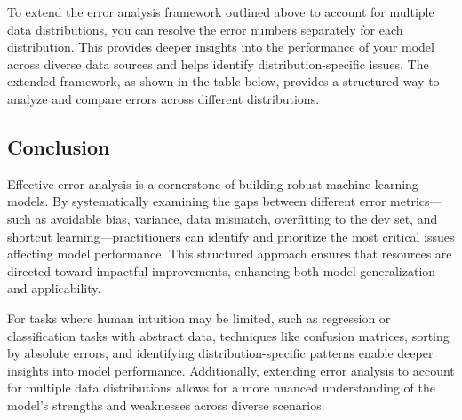 \documentclass[12pt,openany, draft]{book}
\begin{document}
To extend the error analysis framework outlined above to account for multiple data distributions, you can resolve the error numbers separately for each distribution. This provides deeper insights into the performance of your model across diverse data sources and helps identify distribution-specific issues. The extended framework, as shown in the table below, provides a structured way to analyze and compare errors across different distributions.

\begin{table}[ht!]
\caption{Extended technique for error analysis to resolve for the different data distributions.}
\label{tab:errors_distributions}
\centering
{}
\end{table}


\subsection{Conclusion}
Effective error analysis is a cornerstone of building robust machine learning models. By systematically examining the gaps between different error metrics—such as avoidable bias, variance, data mismatch, overfitting to the dev set, and shortcut learning—practitioners can identify and prioritize the most critical issues affecting model performance. This structured approach ensures that resources are directed toward impactful improvements, enhancing both model generalization and applicability. \newline

For tasks where human intuition may be limited, such as regression or classification tasks with abstract data, techniques like confusion matrices, sorting by absolute errors, and identifying distribution-specific patterns enable deeper insights into model performance. Additionally, extending error analysis to account for multiple data distributions allows for a more nuanced understanding of the model’s strengths and weaknesses across diverse scenarios. \newline
\end{document}

